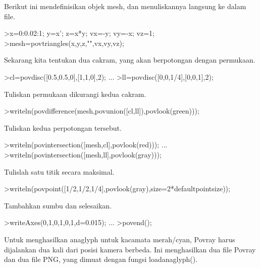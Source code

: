 \documentclass[12pt,arial,letterpaper]{book}
\begin{document}
\begin{eulercomment}
\begin{eulercomment}
\begin{eulercomment}
\begin{eulercomment}
\begin{eulercomment}
\begin{eulercomment}
\begin{eulercomment}
\begin{eulercomment}
\begin{eulercomment}
\begin{eulercomment}
\begin{eulercomment}
\begin{eulercomment}
\begin{eulercomment}
\begin{eulercomment}
\begin{eulercomment}
\begin{eulercomment}
\begin{eulercomment}
\begin{eulercomment}
\begin{eulercomment}
Berikut ini mendefinisikan objek mesh, dan menuliskannya langsung ke
dalam file.
\end{eulercomment}
\begin{eulerprompt}
>x=0:0.02:1; y=x'; z=x*y; vx=-y; vy=-x; vz=1;
>mesh=povtriangles(x,y,z,"",vx,vy,vz);
\end{eulerprompt}
\begin{eulercomment}
Sekarang kita tentukan dua cakram, yang akan berpotongan dengan
permukaan.
\end{eulercomment}
\begin{eulerprompt}
>cl=povdisc([0.5,0.5,0],[1,1,0],2); ...
>ll=povdisc([0,0,1/4],[0,0,1],2);
\end{eulerprompt}
\begin{eulercomment}
Tuliskan permukaan dikurangi kedua cakram.
\end{eulercomment}
\begin{eulerprompt}
>writeln(povdifference(mesh,povunion([cl,ll]),povlook(green)));
\end{eulerprompt}
\begin{eulercomment}
Tuliskan kedua perpotongan tersebut.
\end{eulercomment}
\begin{eulerprompt}
>writeln(povintersection([mesh,cl],povlook(red))); ...
>writeln(povintersection([mesh,ll],povlook(gray)));
\end{eulerprompt}
\begin{eulercomment}
Tulislah satu titik secara maksimal.
\end{eulercomment}
\begin{eulerprompt}
>writeln(povpoint([1/2,1/2,1/4],povlook(gray),size=2*defaultpointsize));
\end{eulerprompt}
\begin{eulercomment}
Tambahkan sumbu dan selesaikan.
\end{eulercomment}
\begin{eulerprompt}
>writeAxes(0,1,0,1,0,1,d=0.015); ...
>povend();
\end{eulerprompt}
\begin{eulercomment}
Untuk menghasilkan anaglyph untuk kacamata merah/cyan, Povray harus
dijalankan dua kali dari posisi kamera berbeda. Ini menghasilkan dua
file Povray dan dua file PNG, yang dimuat dengan fungsi
loadanaglyph().


\end{eulercomment}
\end{eulercomment}
\end{eulercomment}
\end{eulercomment}
\end{eulercomment}
\end{eulercomment}
\end{eulercomment}
\end{eulercomment}
\end{eulercomment}
\end{eulercomment}
\end{eulercomment}
\end{eulercomment}
\end{eulercomment}
\end{eulercomment}
\end{eulercomment}
\end{eulercomment}
\end{eulercomment}
\end{eulercomment}
\end{eulercomment}
\end{document}
